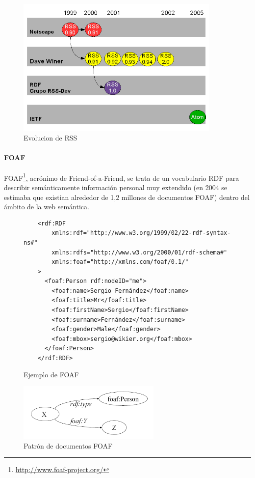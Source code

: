 \begin{figure}[ht]
	\centering
	\includegraphics[width=10cm]{images/rssEvolution.png}
	\caption{Evolucion de RSS}
	\label{fig:rssEvolution}
\end{figure}

\paragraph{FOAF}

FOAF\footnote{\url{http://www.foaf-project.org/}}, acrónimo de Friend-of-a-Friend, 
se trata de un vocabulario RDF para describir semánticamente información personal
muy extendido (en 2004 se estimaba\cite{Li2005} que existian alrededor de 1,2 millones 
de documentos FOAF) dentro del ámbito de la web semántica.

\begin{figure} [ht]
\begin{verbatim}
	<rdf:RDF
		xmlns:rdf="http://www.w3.org/1999/02/22-rdf-syntax-ns#"
		xmlns:rdfs="http://www.w3.org/2000/01/rdf-schema#"
		xmlns:foaf="http://xmlns.com/foaf/0.1/"
	>
	  <foaf:Person rdf:nodeID="me">
	    <foaf:name>Sergio Fernández</foaf:name>
	    <foaf:title>Mr</foaf:title>
	    <foaf:firstName>Sergio</foaf:firstName>
	    <foaf:surname>Fernández</foaf:surname>
	    <foaf:gender>Male</foaf:gender>
	    <foaf:mbox>sergio@wikier.org</foaf:mbox>
	  </foaf:Person>
	</rdf:RDF>
\end{verbatim}
	\caption{Ejemplo de FOAF}
	\label{fig:ejemplo.foaf}
\end{figure}

\begin{figure}
 	\centering
	\includegraphics[width=7cm]{images/patron-foaf.png}
	\caption{Patrón de documentos FOAF}
	\label{fig:patternFOAF}
\end{figure}

